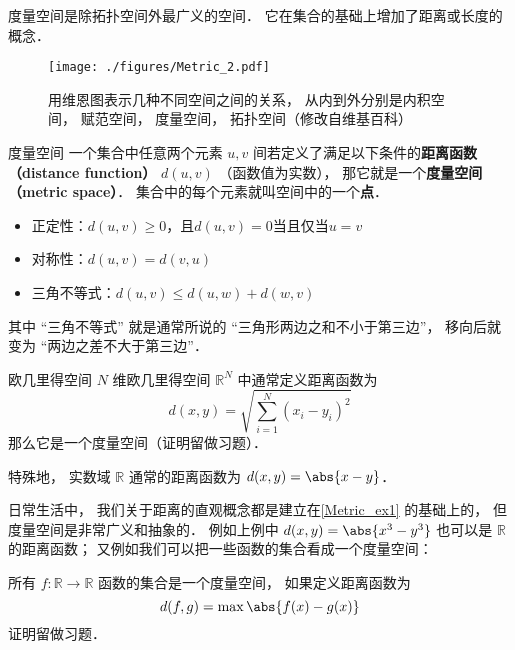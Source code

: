 

度量空间是除拓扑空间外最广义的空间． 它在集合的基础上增加了距离或长度的概念．
\begin{figure}[ht]
\centering
\texttt{[image: ./figures/Metric\_2.pdf]}
\caption{用维恩图表示几种不同空间之间的关系， 从内到外分别是内积空间， 赋范空间， 度量空间， 拓扑空间（修改自维基百科）} \label{Metric_fig2}
\end{figure}

\begin{definition}{度量空间}\label{Metric_def2}
一个集合中任意两个元素 $u, v$ 间若定义了满足以下条件的\textbf{距离函数（distance function）} $d(u, v)$ （函数值为实数）， 那它就是一个\textbf{度量空间（metric space）}． 集合中的每个元素就叫空间中的一个\textbf{点}．
\begin{itemize}
\item 正定性：$d(u, v) \geq 0$，且$d(u, v)=0$当且仅当$u=v$
\item 对称性：$d(u, v) = d(v, u)$
\item 三角不等式：$d(u, v) \leqslant d(u, w) + d(w, v)$
\end{itemize}
\end{definition}
其中 “三角不等式” 就是通常所说的 “三角形两边之和不小于第三边”， 移向后就变为 “两边之差不大于第三边”．

\begin{example}{欧几里得空间}\label{Metric_ex1}
$N$ 维欧几里得空间 $\mathbb R^N$ 中通常定义距离函数为
\begin{equation}\label{Metric_eq1}
d(x, y) = \sqrt{\sum_{i=1}^N (x_i - y_i)^2}
\end{equation}
那么它是一个度量空间（证明留做习题）．

特殊地， 实数域 $\mathbb R$ 通常的距离函数为 $d(x, y) = \abs{x - y}$．
\end{example}

日常生活中， 我们关于距离的直观概念都是建立在\autoref{Metric_ex1} 的基础上的， 但度量空间是非常广义和抽象的． 例如上例中 $d(x, y) = \abs{x^3 - y^3}$ 也可以是 $\mathbb R$ 的距离函数； 又例如我们可以把一些函数的集合看成一个度量空间：
\begin{example}{}\label{Metric_ex2}
所有 $f:\mathbb R \to \mathbb R$ 函数的集合是一个度量空间， 如果定义距离函数为
\begin{equation}
d(f, g) = \max{\abs{f(x) - g(x)}}
\end{equation}
证明留做习题．
\end{example}

